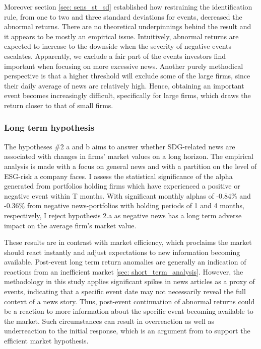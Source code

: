 Moreover section \ref{sec: sens_st_sd} established how restraining the identification rule, from one to two and three standard deviations for events, decreased the abnormal returns. There are no theoretical underpinnings behind the result and it appears to be mostly an empirical issue. Intuitively, abnormal returns are expected to increase to the downside when the severity of negative events escalates. Apparently, we exclude a fair part of the events investors find important when focusing on more excessive news. Another purely methodical perspective is that a higher threshold will exclude some of the large firms, since their daily average of news are relatively high. Hence, obtaining an important event becomes increasingly difficult, specifically for large firms, which draws the return closer to that of small firms.  



\subsubsection{Long term hypothesis}

The hypotheses \#2 a and b aims to answer whether SDG-related news are associated with changes in firms' market values on a long horizon. The empirical analysis is made with a focus on general news and with a partition on the level of ESG-risk a company faces. I assess the statistical significance of the alpha generated from portfolios holding firms which have experienced a positive or negative event within T months. With significant monthly alphas of -0.84\% and -0.36\% from negative news-portfolios with holding periods of 1 and 4 months, respectively, I reject hypothesis 2.a as negative news has a long term adverse impact on the average firm's market value.   

These results are in contrast with market efficiency, which proclaims the market should react instantly and adjust expectations to new information becoming available. Post-event long term return anomalies are generally an indication of reactions from an inefficient market \ref{sec: short_term_analysis}. However, the methodology in this study applies significant spikes in news articles as a proxy of events, indicating that a specific event date may not necessarily reveal the full context of a news story. Thus, post-event continuation of abnormal returns could be a reaction to more information about the specific event becoming available to the market. Such circumstances can result in overreaction as well as underreaction to the initial response, which is an argument from \cite{fama1998_events} to support the efficient market hypothesis.   

